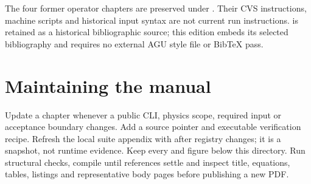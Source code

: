 The four former operator chapters are preserved under .
Their CVS instructions, machine scripts and historical input syntax are not
current run instructions.  is retained as a historical
bibliographic source; this edition embeds its selected bibliography and
requires no external AGU style file or BibTeX pass.

\section{Maintaining the manual}
Update a chapter whenever a public CLI, physics scope, required input or
acceptance boundary changes. Add a source pointer and executable verification
recipe. Refresh the local suite appendix with 
after registry changes; it is a snapshot, not runtime evidence.
Keep every \code{} and figure below this directory. Run structural
checks, compile until references settle and inspect title, equations, tables,
listings and representative body pages before publishing a new PDF.
